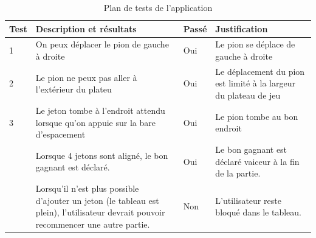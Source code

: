 \begin{table}[H]
    \centering
    \caption{Plan de tests de l'application}
    \begin{tabular}{p{0.25in}p{2.5in}p{0.5in}p{2.5in}}
        \hline
        \bfseries Test & \bfseries Description et résultats & \bfseries Passé & \bfseries Justification \\
        \hline\hline
        1 & On peux déplacer le pion de gauche à droite & Oui & Le pion se déplace de gauche à droite \\
        2 & Le pion ne peux pas aller à l'extérieur du plateu & Oui & Le déplacement du pion est limité à la largeur du plateau de jeu \\
        3 & Le jeton tombe à l'endroit attendu lorsque qu'on appuie sur la bare d'espacement & Oui & Le pion tombe au bon endroit \\
         & Lorsque 4 jetons sont aligné, le bon gagnant est déclaré. & Oui & Le bon gagnant est déclaré vaiceur à la fin de la partie.\\
         & Lorsqu'il n'est plus possible d'ajouter un jeton (le tableau est plein), l'utilisateur devrait pouvoir recommencer une autre partie.& Non & L'utilisateur reste bloqué dans le tableau.\\
         \hline
    \end{tabular}
\end{table}
